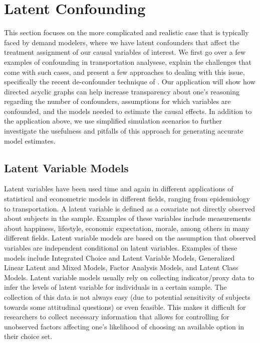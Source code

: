 \section{Latent Confounding}
\label{sec:latent-confounding}

This section focuses on the more complicated and realistic case that is 
typically faced by demand modelers, where we have latent confounders that 
affect the treatment assignment of our causal variables of interest. 
We first go over a few examples of confounding in transportation analysese, explain 
the challenges that come with such cases, and present a few approaches to 
dealing with this issue, specifically the recent de-confounder technique of 
\citet{wang_2019_blessings}. 
Our application will show how directed acyclic graphs can 
help increase transparency about one's reasoning regarding the number of 
confounders, assumptions for which variables are confounded, and the models 
needed to estimate the causal effects. 
In addition to the application above, we use simplified simulation scenarios to further investigate the usefulness 
and pitfalls of this approach for generating accurate model estimates. 

\subsection{Latent Variable Models}
\label{intro-latent-models}
Latent variables have been used time and again in different applications of statistical 
and econometric models in different fields, ranging from epidemiology to transportation.
A latent variable is defined as a covariate not directly observed about subjects in the sample.
Examples of these variables include measurements about happiness, lifestyle, economic expectation, 
morale, among others in many different fields.
Latent variable models are based on the assumption that observed variables are independent 
conditional on latent variables.
Examples of these models include Integrated Choice and Latent Variable Models, Generalized Linear Latent and Mixed Models, Factor Analysis Models, and Latent Class Models.
Latent variable models usually rely on collecting indicator/proxy data to infer the levels of latent variable for individuals in a certain sample.
The collection of this data is not always easy (due to potential sensitivity of subjects towards some attitudinal questions)
or even feasible. 
This makes it difficult for researchers to collect necessary information that allows
for controlling for unobserved factors affecting one's likelihood of choosing an available option in their choice set.


